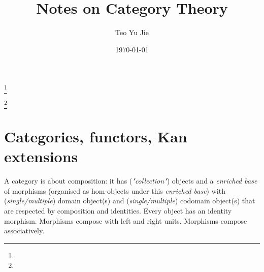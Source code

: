 \documentclass[10pt]{amsbook}
\theoremstyle{definition}
\theoremstyle{remark}
\numberwithin{section}{chapter}
\numberwithin{equation}{chapter}
\begin{document}
\frontmatter

\title{Notes on Category Theory}


\author{Teo Yu Jie}
\address{}
\curraddr{}
\thanks{}

\author{}
\address{}
\curraddr{}
\email{}
\thanks{}


\keywords{}

\date{\today}

\begin{abstract}
\end{abstract}

\maketitle


\setcounter{page}{4}

\tableofcontents



\mainmatter

\chapter{Categories, functors, Kan extensions}

A category is about composition: it has (\textit{"collection"}) objects and a \textit{enriched base} of morphisms (organised as hom-objects under this \textit{enriched base}) with (\textit{single/multiple}) domain object(s) and (\textit{single/multiple}) codomain object(s) that are respected by composition and identities. Every object has an identity morphism. Morphisms compose with left and right units. Morphisms compose associatively.
\end{document}

